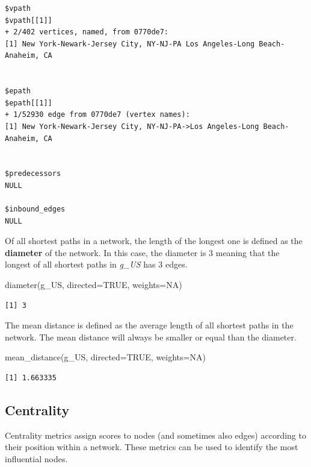 \documentclass[
  letterpaper,
  DIV=11,
  numbers=noendperiod]{scrreprt}
\newenvironment{Shaded}{\begin{snugshade}}{\end{snugshade}}
\newcommand{\AttributeTok}[1]{\textcolor[rgb]{0.40,0.45,0.13}{#1}}
\newcommand{\ConstantTok}[1]{\textcolor[rgb]{0.56,0.35,0.01}{#1}}
\newcommand{\FunctionTok}[1]{\textcolor[rgb]{0.28,0.35,0.67}{#1}}
\newcommand{\NormalTok}[1]{\textcolor[rgb]{0.00,0.23,0.31}{#1}}
\begin{document}
\begin{verbatim}
$vpath
$vpath[[1]]
+ 2/402 vertices, named, from 0770de7:
[1] New York-Newark-Jersey City, NY-NJ-PA Los Angeles-Long Beach-Anaheim, CA   


$epath
$epath[[1]]
+ 1/52930 edge from 0770de7 (vertex names):
[1] New York-Newark-Jersey City, NY-NJ-PA->Los Angeles-Long Beach-Anaheim, CA


$predecessors
NULL

$inbound_edges
NULL
\end{verbatim}

Of all shortest paths in a network, the length of the longest one is
defined as the \textbf{diameter} of the network. In this case, the
diameter is 3 meaning that the longest of all shortest paths in
\emph{g\_US} has 3 edges.

\begin{Shaded}
\begin{Highlighting}[]
\FunctionTok{diameter}\NormalTok{(g\_US, }\AttributeTok{directed=}\ConstantTok{TRUE}\NormalTok{, }\AttributeTok{weights=}\ConstantTok{NA}\NormalTok{)}
\end{Highlighting}
\end{Shaded}

\begin{verbatim}
[1] 3
\end{verbatim}

The mean distance is defined as the average length of all shortest paths
in the network. The mean distance will always be smaller or equal than
the diameter.

\begin{Shaded}
\begin{Highlighting}[]
\FunctionTok{mean\_distance}\NormalTok{(g\_US, }\AttributeTok{directed=}\ConstantTok{TRUE}\NormalTok{, }\AttributeTok{weights=}\ConstantTok{NA}\NormalTok{)}
\end{Highlighting}
\end{Shaded}

\begin{verbatim}
[1] 1.663335
\end{verbatim}

\hypertarget{centrality}{%
\subsection{Centrality}\label{centrality}}

Centrality metrics assign scores to nodes (and sometimes also edges)
according to their position within a network. These metrics can be used
to identify the most influential nodes.
\end{document}
